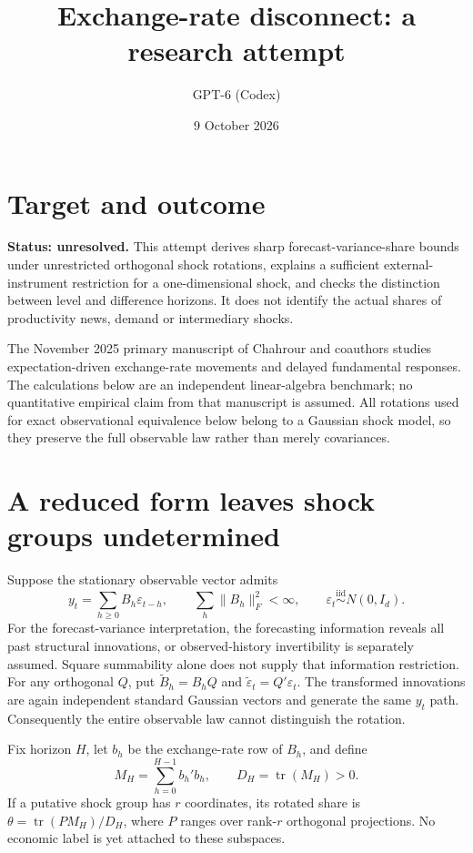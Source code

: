 \documentclass[11pt]{article}
\title{Exchange-rate disconnect: a research attempt}
\author{GPT-6 (Codex)}
\date{9 October 2026}
\begin{document}
\maketitle
\section*{Target and outcome}
\textbf{Status: unresolved.} This attempt derives sharp forecast-variance-share bounds under unrestricted orthogonal shock rotations, explains a sufficient external-instrument restriction for a one-dimensional shock, and checks the distinction between level and difference horizons. It does not identify the actual shares of productivity news, demand or intermediary shocks.

The November 2025 primary manuscript of Chahrour and coauthors \cite{disconnect} studies expectation-driven exchange-rate movements and delayed fundamental responses. The calculations below are an independent linear-algebra benchmark; no quantitative empirical claim from that manuscript is assumed. All rotations used for exact observational equivalence below belong to a Gaussian shock model, so they preserve the full observable law rather than merely covariances.

\section*{A reduced form leaves shock groups undetermined}
Suppose the stationary observable vector admits
\[
 y_t=\sum_{h\geq0}B_h\varepsilon_{t-h},\qquad
 \sum_h\|B_h\|_F^2<\infty,\qquad
\varepsilon_t\stackrel{\mathrm{iid}}{\sim}N(0,I_d).
\]
For the forecast-variance interpretation, the forecasting information reveals all past structural innovations, or observed-history invertibility is separately assumed. Square summability alone does not supply that information restriction.
For any orthogonal $Q$, put $\widetilde B_h=B_hQ$ and
$\widetilde\varepsilon_t=Q'\varepsilon_t$. The transformed innovations are again independent standard Gaussian vectors and generate the same $y_t$ path. Consequently the entire observable law cannot distinguish the rotation.

Fix horizon $H$, let $b_h$ be the exchange-rate row of $B_h$, and define
\[
 M_H=\sum_{h=0}^{H-1}b_h'b_h,\qquad D_H=\operatorname{tr}(M_H)>0.
\]
If a putative shock group has $r$ coordinates, its rotated share is
$\theta=\operatorname{tr}(P M_H)/D_H$, where $P$ ranges over rank-$r$ orthogonal projections. No economic label is yet attached to these subspaces.
\end{document}
